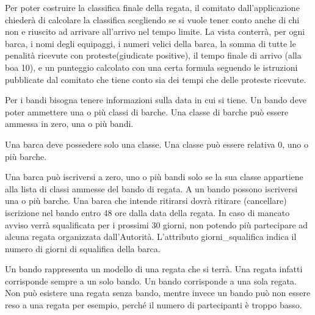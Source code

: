 \documentclass{article}
\begin{document}
\begin{flushleft}
Per poter costruire la classifica finale della regata, il comitato dall'applicazione chiederà di calcolare la classifica scegliendo se si vuole tener conto anche di chi non e riuscito ad arrivare all'arrivo nel tempo limite.
La vista conterrà, per ogni barca, i nomi degli equipaggi, i numeri velici della barca, la somma di tutte le penalità ricevute con proteste(giudicate positive), il tempo finale di arrivo (alla boa 10), e un punteggio calcolato con una certa formula seguendo le istruzioni pubblicate dal comitato che tiene conto sia dei tempi che delle proteste ricevute.
\end{flushleft}

\begin{flushleft}
Per i bandi bisogna tenere informazioni sulla data in cui si tiene.\newline
Un bando deve poter ammettere una o più classi di barche.
Una classe di barche può essere ammessa in zero, una o più bandi.
\end{flushleft}

\begin{flushleft}
Una barca deve possedere solo una classe.
Una classe può essere relativa 0, uno o più  barche.
\end{flushleft}

\begin{flushleft}
Una barca può iscriversi a zero, uno o più bandi solo se la sua classe appartiene alla lista di classi ammesse del bando di regata.\newline
A un bando possono iscriversi una o più barche.\newline
Una barca che intende ritirarsi dovrà ritirare (cancellare) iscrizione nel bando entro 48 ore dalla data della regata. In caso di mancato avviso verrà squalificata per i prossimi 30 giorni, non potendo più partecipare ad alcuna regata organizzata dall'Autorità.
L'attributo giorni\_squalifica indica il numero di giorni di squalifica della barca. 
\end{flushleft}

\begin{flushleft}
Un bando rappresenta un modello di una regata che si terrà.
Una regata infatti corrisponde sempre a un solo bando. Un bando corrisponde a una sola regata. Non può esistere una regata senza bando, mentre invece un bando può non essere reso a una regata per esempio, perché il numero di partecipanti è troppo basso.
\end{flushleft}
\end{document}
